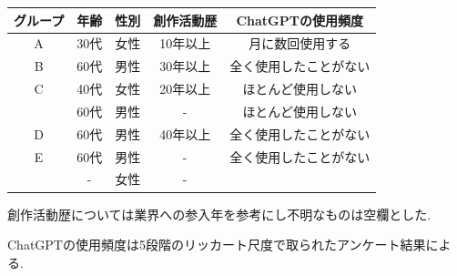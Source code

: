 \documentclass[a4j,12pt]{jsreport}
\begin{document}
\vspace*{-0.4cm}
\setlongtables
\begin{threeparttable}
   \begin{tabularx}{\textwidth}{ccccc}
      \caption[参加グループの構成]{参加グループの構成. \label{group}}
      \setlength{\belowcaptionskip}{-1pt}
      \vspace*{-0.2cm}
         \endfirsthead
   \hline
   グループ & 年齢 & 性別 & 創作活動歴\tnote{*} & ChatGPTの使用頻度\tnote{2}  \\ \hline
   A & 30代 & 女性 & 10年以上 & 月に数回使用する\\
   B & 60代 & 男性 & 30年以上 & 全く使用したことがない\\
   C & 40代 & 女性 & 20年以上 & ほとんど使用しない\\
   & 60代 & 男性 & - & ほとんど使用しない\\
   D & 60代 & 男性 & 40年以上 & 全く使用したことがない\\
   E & 60代 & 男性 & - & 全く使用したことがない \\
   & - & 女性 & - & \\
   \hline
   \end{tabularx}
   \vspace*{-0.5cm}
   \begin{tablenotes}\footnotesize
      \item[1] 創作活動歴については業界への参入年を参考にし不明なものは空欄とした. 
      \item[2] ChatGPTの使用頻度は5段階のリッカート尺度で取られたアンケート結果による.
   \end{tablenotes}
\end{threeparttable}
\vspace*{0.5cm}
\end{document}
